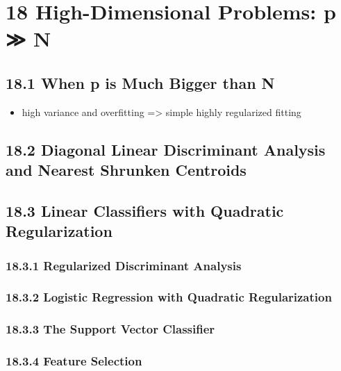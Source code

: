 \documentclass[11pt]{article}
\providecommand{\tightlist}{%
      \setlength{\itemsep}{0pt}\setlength{\parskip}{0pt}}
\begin{document}
    \section{18 High-Dimensional Problems: p ≫
N}\label{high-dimensional-problems-p-n}

\subsection{18.1 When p is Much Bigger than
N}\label{when-p-is-much-bigger-than-n}

\begin{itemize}
\tightlist
\item
  high variance and overfitting =\textgreater{} simple highly
  regularized fitting
\end{itemize}

\subsection{18.2 Diagonal Linear Discriminant Analysis and Nearest
Shrunken
Centroids}\label{diagonal-linear-discriminant-analysis-and-nearest-shrunken-centroids}

\subsection{18.3 Linear Classifiers with Quadratic
Regularization}\label{linear-classifiers-with-quadratic-regularization}

\subsubsection{18.3.1 Regularized Discriminant
Analysis}\label{regularized-discriminant-analysis}

\subsubsection{18.3.2 Logistic Regression with Quadratic
Regularization}\label{logistic-regression-with-quadratic-regularization}

\subsubsection{18.3.3 The Support Vector
Classifier}\label{the-support-vector-classifier}

\subsubsection{18.3.4 Feature Selection}\label{feature-selection}
\end{document}
